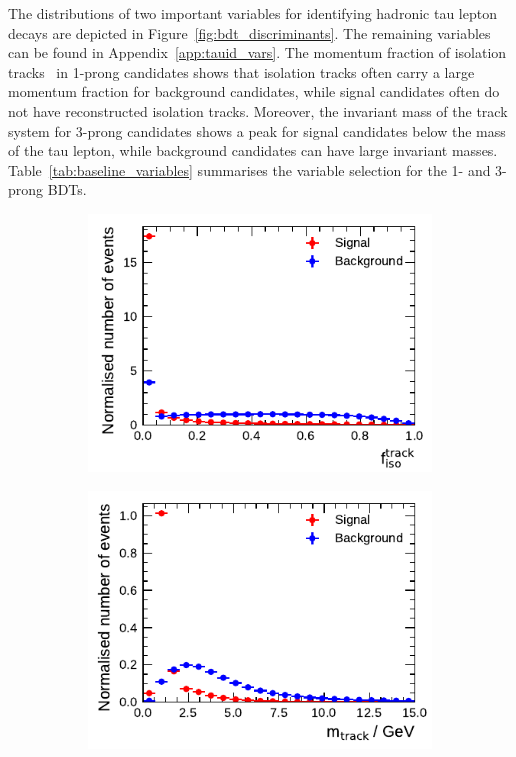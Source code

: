 The distributions of two important variables for identifying hadronic tau lepton
decays are depicted in Figure~\ref{fig:bdt_discriminants}. The remaining
variables can be found in Appendix~\ref{app:tauid_vars}. The momentum fraction
of isolation tracks~ in 1-prong \tauhadvis
candidates shows that isolation tracks often carry a large momentum fraction for
background candidates, while signal candidates often do not have reconstructed
isolation tracks. Moreover, the invariant mass of the track system for 3-prong
\tauhadvis candidates shows a peak for signal candidates below the mass of the
tau lepton, while background candidates can have large invariant masses.
Table~\ref{tab:baseline_variables} summarises the variable selection for the 1-
and 3-prong BDTs.

\begin{figure}[htb]
  \begin{subfigure}[t]{0.48\textwidth}
    \centering
    \includegraphics{./figures/baseline_bdt_vars/1p/SumPtTrkFrac.pdf}
    \label{fig:sumpttrkfrac}
  \end{subfigure}\hfill
  \begin{subfigure}[t]{0.48\textwidth}
    \centering
    \includegraphics{./figures/baseline_bdt_vars/3p/massTrkSys.pdf}

\end{subfigure}
\end{figure}
